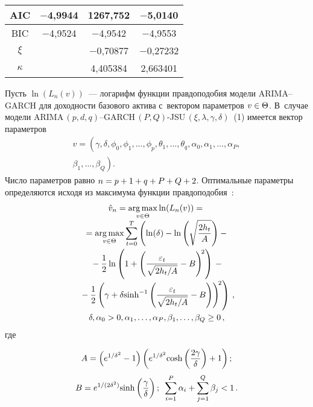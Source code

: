 \begin{multicols}{2}
\begin{table*}[b]
\begin{minipage}[t]{80mm}
\begin{center}
{\begin{tabular}{|c|c|c|c|}
\hline
AIC&$-$4,9944&1267,752&$-$5,0140\\ 
\hline
BIC&$-$4,9524&$-$4,9542&$-$4,9553\\
\hline
$\xi$&&$-$0,70877&$-$0,27232\\
\hline
$\kappa$&&4,405384&2,663401\\
\hline
\end{tabular}
}
\end{center}
\end{minipage}
\vspace*{-3pt}
\end{table*}

  Пусть $\ln(L_n(v))$~--- логарифм функции правдоподобия модели  
ARIMA--GARCH для доходности базового актива с~вектором параметров 
$v\hm\in \Theta$. В~случае модели  
ARIMA$\,(p,d,q)$--GARCH$\,(P,Q)$-JSU$\,(\xi,\lambda,\gamma,\delta)$~(1) 
имеется вектор параметров 
\begin{multline*}
v= \left(\gamma, \delta, \phi_0, \phi_1, \ldots , \phi_p, 
\theta_1, \ldots , \theta_q, \alpha_0, \alpha_1, \ldots , \alpha_P,\right.\\
\left. \beta_1, \ldots , 
\beta_Q\right).
\end{multline*}
 Число параметров равно $n\hm= p\hm+ 1\hm+q\hm+ P\hm+Q\hm+2$. 
Оптимальные параметры определяются исходя из максимума функции  
правдоподобия~\cite{8-dan}:
  \begin{multline}
  \hat{v}_n=\mathop{\mathrm{arg}\,\mathrm{max}}\limits_{v\in\Theta} \ln (L_n(v))={}\\[-3pt]
  {}=\mathop{\mathrm{arg}\,\mathrm{max}}\limits_{v\in \Theta} \sum\limits^T_{t=0} \left( \ln(\delta)-
\ln \left(\sqrt{\displaystyle\frac{\displaystyle 2h_t\mathstrut}{\displaystyle A\mathstrut}}\right)-{}\right.\\[-1pt]
\left.{}- \displaystyle\frac{\displaystyle 1\mathstrut}{\displaystyle 2\mathstrut}\ln\left(1+\left( 
\displaystyle\frac{\displaystyle \varepsilon_t\mathstrut}{\displaystyle \sqrt{2h_t/A}\mathstrut}-B\right)^{\!2}\right) \right.-{}\\[-3pt]
  \left.{}-\displaystyle\frac{\displaystyle 1\mathstrut}{\displaystyle 2\mathstrut}\left(\gamma+\delta\mathrm{sinh}^{-1}\left( 
\displaystyle\frac{\displaystyle \varepsilon_t\mathstrut}{\displaystyle \sqrt{2h_t/A}\mathstrut}-B\right)\right)^{\!2}\right)\,,\\[-1pt]
\delta, \alpha_0>0,\alpha_1,\ldots , \alpha_P, \beta_1,\ldots , \beta_Q\geq 0\,,
\label{e8-dan}
\end{multline}
где 


\noindent
$$
A=\left(e^{1/\delta^2}-1\right)\left(e^{1/\delta^2}\mathrm{cosh}\left(\displaystyle\frac{\displaystyle 2\gamma\mathstrut}{\displaystyle \delta\mathstrut}\right)+1\right);
$$ 
$$
B=e^{1/(2\delta^2)}\mathrm{sinh}\left(\displaystyle\frac{\displaystyle \gamma\mathstrut}{\displaystyle \delta\mathstrut}\right); \enskip
\sum\limits_{i=1}^P 
\alpha_i+ \sum\limits^Q_{j=1} \beta_j <1\,.
$$ 
  

\end{multicols}
